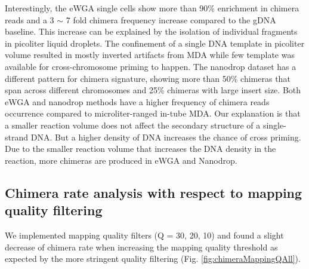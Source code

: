 Interestingly, the eWGA single cells show more than 90\% enrichment in  chimera reads and a 3 $\sim$ 7 fold chimera frequency increase compared to the gDNA baseline. This increase can be explained by the isolation of individual fragments in picoliter liquid droplets. The confinement of a single DNA template in picoliter volume resulted in mostly inverted artifacts from MDA while few template was available for cross-chromosome priming to happen. The nanodrop dataset has a different pattern for chimera signature, showing more than 50\% chimeras that span across different chromosomes and 25\% chimeras with large insert size. Both eWGA and nanodrop methods have a higher frequency of chimera reads occurrence compared to microliter-ranged in-tube MDA. Our explanation is that a smaller reaction volume does not affect the secondary structure of a single-strand DNA. But a higher density of DNA increases the chance of cross priming. Due to the smaller reaction volume that increases the DNA density in the reaction, more chimeras are produced in eWGA and Nanodrop. 



\subsection{Chimera rate analysis with respect to mapping quality filtering} %
We implemented mapping quality filters (Q = 30, 20, 10) and found a slight decrease of chimera rate when increasing the mapping quality threshold as expected by the more stringent quality filtering (Fig. \ref{fig:chimeraMappingQAll}). 

